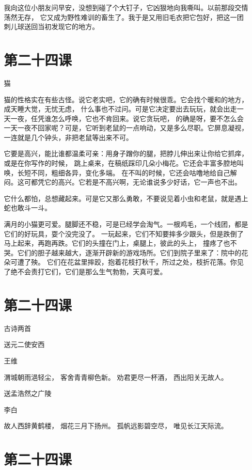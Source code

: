 \documentclass[12pt,UTF8]{ctexbook}
\begin{document}
我向这位小朋友问早安，没想到碰了个大钉子，它凶狠地向我嘶叫。以前那段交情荡然无存，
它又成为野性难训的畜生了。我于是又用旧毛衣把它包好，把这一团刺儿球送回当初发现它的地方。

\section{第二十四课}

猫

猫的性格实在有些古怪。说它老实吧，它的确有时候很乖。它会找个暖和的地方，成天睡大觉，无忧无虑，
什么事也不过问。可是它决定要出去玩玩，就会出走一天一夜，任凭谁怎么呼唤，它也不肯回来。说它贪玩吧，
的确是呀，要不怎么会一天一夜不回家呢？可是，它听到老鼠的一点响动，又是多么尽职。它屏息凝视，
一连就是几个钟头，非把老鼠等出来不可。

它要是高兴，能比谁都温柔可亲：用身子蹭你的腿，把脖儿伸出来让你给它抓痒，或是在你写作的时候，
跳上桌来，在稿纸踩印几朵小梅花。它还会丰富多腔地叫唤，长短不同，粗细各异，变化多端。
在不叫的时候，它还会咕噜地给自己解闷。这可都凭它的高兴。它若是不高兴啊，无论谁说多少好话，它一声也不出。

它什么都怕，总想藏起来。可是它又那么勇敢，不要说见着小虫和老鼠，就是遇上蛇也敢斗一斗。

满月的小猫更可爱。腿脚还不稳，可是已经学会淘气。一根鸡毛，一个线团，都是它们的好玩具，耍个没完没了。
一玩起来，它们不知要摔多少跟头，但是跌倒了马上起来，再跑再跌。它们的头撞在门上，桌腿上，彼此的头上，
撞疼了也不哭。它们的胆子越来越大，逐渐开辟新的游戏场所。它们到院子里来了：院中的花朵可遭了殃。
它们在花盆里摔跤，抱着花枝打秋千，所过之处，枝折花落。你见了绝不会责打它们，它们是那么生气勃勃，天真可爱。

\section{第二十四课}

古诗两首

送元二使安西

王维

渭城朝雨浥轻尘，
客舍青青柳色新。
劝君更尽一杯酒，
西出阳关无故人。

送孟浩然之广陵

李白

故人西辞黄鹤楼，
烟花三月下扬州。
孤帆远影碧空尽，
唯见长江天际流。

\section{第二十四课}
\end{document}
